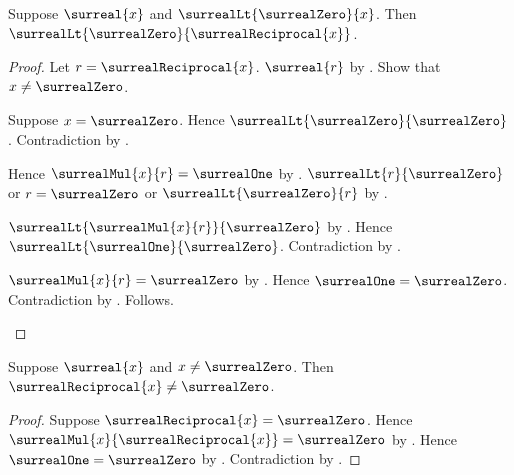 \begin{theorem}\label{surreal_reciprocal_positive}
    Suppose $\surreal{x}$ and
        $\surrealLt{\surrealZero}{x}$.
    Then
        $\surrealLt{\surrealZero}{\surrealReciprocal{x}}$.
\end{theorem}
\begin{proof}
    Let $r=\surrealReciprocal{x}$.
    $\surreal{r}$ by .
    Show that $x\neq\surrealZero$.
    \begin{subproof}
        Suppose $x=\surrealZero$.
        Hence $\surrealLt{\surrealZero}{\surrealZero}$.
        Contradiction by
            .
    \end{subproof}
    Hence $\surrealMul{x}{r}=\surrealOne$
        by .
    $\surrealLt{r}{\surrealZero}$ or $r=\surrealZero$ or
        $\surrealLt{\surrealZero}{r}$
        by .
    \begin{byCase}
            $\surrealLt{\surrealMul{x}{r}}{\surrealZero}$
                by .
            Hence $\surrealLt{\surrealOne}{\surrealZero}$.
            Contradiction by
                .
            \begin{byCase}
                    $\surrealMul{x}{r}=\surrealZero$
                        by .
                    Hence $\surrealOne=\surrealZero$.
                    Contradiction by
                        .
                    Follows.
            \end{byCase}
    \end{byCase}
\end{proof}

\begin{corollary}\label{surreal_reciprocal_nonzero}
    Suppose $\surreal{x}$ and $x\neq\surrealZero$.
    Then $\surrealReciprocal{x}\neq\surrealZero$.
\end{corollary}
\begin{proof}
    Suppose $\surrealReciprocal{x}=\surrealZero$.
    Hence $\surrealMul{x}{\surrealReciprocal{x}}=\surrealZero$
        by .
    Hence $\surrealOne=\surrealZero$
        by .
    Contradiction by
        .
\end{proof}

